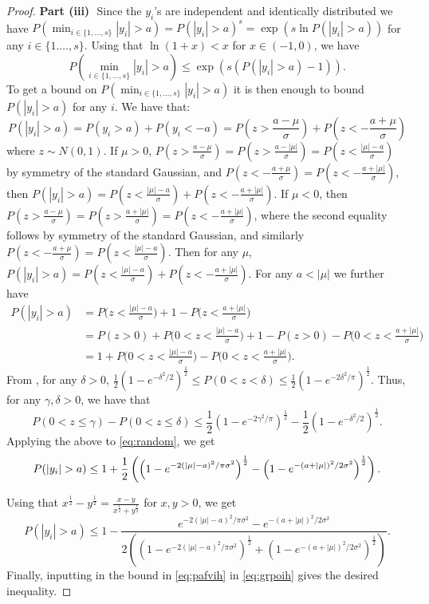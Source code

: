\documentclass[bj,authoryear]{imsart}
\theoremstyle{plain}
\begin{document}
\begin{proof}
\textbf{Part (iii)}\,\, 
Since the $y_i$'s are independent and identically distributed we have $P(\min_{i\in\{1,\ldots,s\}}|y_i|>a)=P(|y_i|>a)^s= \exp\left(s\ln{P(|y_i|>a)}\right)$ for any $i\in\{1.\ldots,s\}$. Using that $\ln\left(1+ x \right)< x$ for $x\in(-1,0)$, we have
\begin{equation}\label{eq:grpoih}
    P(\min_{i\in\{1,\ldots,s\}}|y_i|>a)\leq \exp\left(s(P(|y_i|>a)-1)\right).
\end{equation}
To get a bound on $P(\min_{i\in\{1,\ldots,s\}}|y_i|>a)$ it is then enough to bound $P(|y_i|>a)$ for any $i$. We have that:
$$P(|y_i|>a) = P(y_i>a) + P(y_i<-a) = P(z>\frac{a-\mu}{\sigma}) + P(z<-\frac{a+\mu}{\sigma})$$
where $z\sim N(0,1)$. If $\mu>0$, $P(z>\frac{a-\mu}{\sigma})  =  P(z>\frac{a-|\mu|}{\sigma})= P(z<\frac{|\mu|-a}{\sigma})$ by symmetry of the standard Gaussian, and $P(z<-\frac{a+\mu}{\sigma})=P(z<-\frac{a+|\mu|}{\sigma})$, then $P(|y_i|>a) =  P(z<\frac{|\mu|-a}{\sigma}) + P(z<-\frac{a+|\mu|}{\sigma})$.
If $\mu<0$, then $P(z>\frac{a-\mu}{\sigma})=P(z>\frac{a+|\mu|}{\sigma})=P(z<-\frac{a+|\mu|}{\sigma})$, where the second equality follows by symmetry of the standard Gaussian, and similarly $P(z<-\frac{a+\mu}{\sigma})=P(z<\frac{|\mu|-a}{\sigma})$. Then for any $\mu$, $P(|y_i|>a)  = P(z<\frac{|\mu|-a}{\sigma}) + P(z<-\frac{a+|\mu|}{\sigma}) $. For any $a<|\mu|$ we further have
\begin{align}
    P(|y_i|>a) &= P\Big(z<\frac{|\mu|-a}{\sigma}\Big) + 1- P\Big(z<\frac{a+|\mu|}{\sigma}\Big) \nonumber \\
    &= P(z>0)
    +P\Big(0<z<\frac{|\mu|-a}{\sigma}\Big)+ 1 - P(z>0) - P\Big(0<z<\frac{a+|\mu|}{\sigma}\Big) \nonumber \\
    &= 1+P\Big(0<z<\frac{|\mu|-a}{\sigma}\Big)-P\Big(0<z<\frac{a+|\mu|}{\sigma}\Big)\label{eq:random}.
\end{align}
From \cite{chu}, for any $\delta>0$, $\frac{1}{2}\left(1-e^{-\delta^2/2}\right)^{\frac{1}{2}}\leq P(0 <z < \delta)\leq \frac{1}{2}\left(1-e^{-2\delta^2/\pi}\right)^{\frac{1}{2}}$. Thus, for any $\gamma,\delta>0$, we have that
$$ P(0<z \leq \gamma)-P(0<z \leq \delta)\leq
\frac{1}{2}\left(1-e^{-2\gamma^2/\pi}\right)^{\frac{1}{2}}-\frac{1}{2}\left(1-e^{-\delta^2/2}\right)^{\frac{1}{2}}.$$
Applying the above to \eqref{eq:random}, we get
$$P(|y_i|>a) \leq 
1+ \frac{1}{2}\left(\left(1-e^{-2(|\mu|-a)^2/\pi\sigma^2}\right)^{\frac{1}{2}}-\left(1-e^{-(a+|\mu|)^2/2\sigma^2}\right)^{\frac{1}{2}}\right).\\$$

Using that $x^{\frac{1}{2}}-y^{\frac{1}{2}}=\frac{x-y}{x^{\frac{1}{2}}+y^{\frac{1}{2}}}$ for $x,y>0$, we get
 \begin{equation}\label{eq:pafvih}
    P(|y_i|>a) \leq 1- \frac{e^{-2(|\mu|-a)^2/\pi\sigma^2}-e^{-(a+|\mu|)^2/2\sigma^2}}{2\left(\left(1-e^{-2(|\mu|-a)^2/\pi\sigma^2}\right)^{\frac{1}{2}}+\left(1-e^{-(a+|\mu|)^2/2\sigma^2}\right)^{\frac{1}{2}}\right)}. 
 \end{equation}
Finally, inputting in the bound in \eqref{eq:pafvih} in \eqref{eq:grpoih} gives the desired inequality.
\end{proof}
\end{document}
